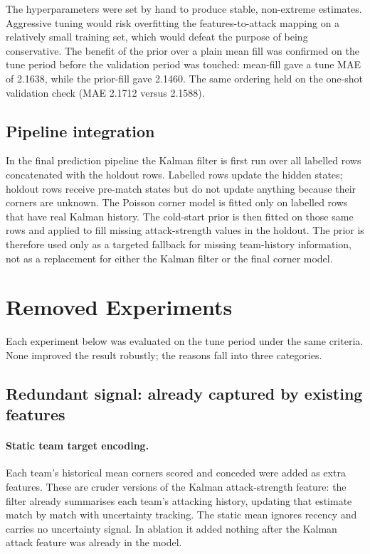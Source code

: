 \documentclass[11pt]{article}
\begin{document}
The hyperparameters were set by hand to produce stable, non-extreme estimates.
Aggressive tuning would risk overfitting the features-to-attack mapping on a
relatively small training set, which would defeat the purpose of being
conservative. The benefit of the prior over a plain mean fill was confirmed
on the tune period before the validation period was touched:
mean-fill gave a tune MAE of 2.1638, while the prior-fill gave 2.1460.
The same ordering held on the one-shot validation check (MAE 2.1712
versus 2.1588).

\subsection{Pipeline integration}

In the final prediction pipeline the Kalman filter is first run over all
labelled rows concatenated with the holdout rows. Labelled rows update the
hidden states; holdout rows receive pre-match states but do not update
anything because their corners are unknown. The Poisson corner model is fitted
only on labelled rows that have real Kalman history. The cold-start prior is
then fitted on those same rows and applied to fill missing attack-strength
values in the holdout. The prior is therefore used only as a targeted fallback
for missing team-history information, not as a replacement for either the
Kalman filter or the final corner model.


\section{Removed Experiments}

Each experiment below was evaluated on the tune period under the same criteria. None improved the result robustly; the reasons
fall into three categories.

\subsection{Redundant signal: already captured by existing features}

\paragraph{Static team target encoding.}
Each team's historical mean corners scored and conceded were added as extra
features. These are cruder versions of the Kalman attack-strength feature: the
filter already summarises each team's attacking history, updating that estimate
match by match with uncertainty tracking. The static mean ignores recency and
carries no uncertainty signal. In ablation it added nothing after the Kalman
attack feature was already in the model.
\end{document}
